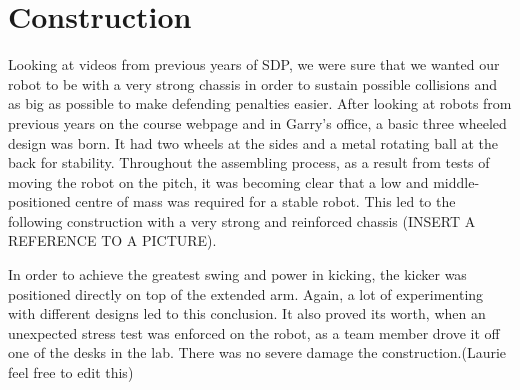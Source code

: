 \section{Construction}

Looking at videos from previous years of SDP, we were sure that we wanted our robot to be with a very strong chassis in order to sustain possible collisions and as big as possible to make defending penalties easier. After looking at robots from previous years on the course webpage and in Garry's office, a basic three wheeled design was born. It had two wheels at the sides and a metal rotating ball at the back for stability. Throughout the assembling process, as a result from tests of moving the robot on the pitch, it was becoming clear that a low and middle-positioned centre of mass was required for a stable robot. This led to the following construction with a very strong and reinforced chassis (INSERT A REFERENCE TO A PICTURE). 

In order to achieve the greatest swing and power in kicking, the kicker was positioned directly on top of the extended arm. Again, a lot of experimenting with different designs led to this conclusion. It also proved its worth, when an unexpected stress test was enforced on the robot, as a team member drove it off one of the desks in the lab. There was no severe damage the construction.(Laurie feel free to edit this) 
